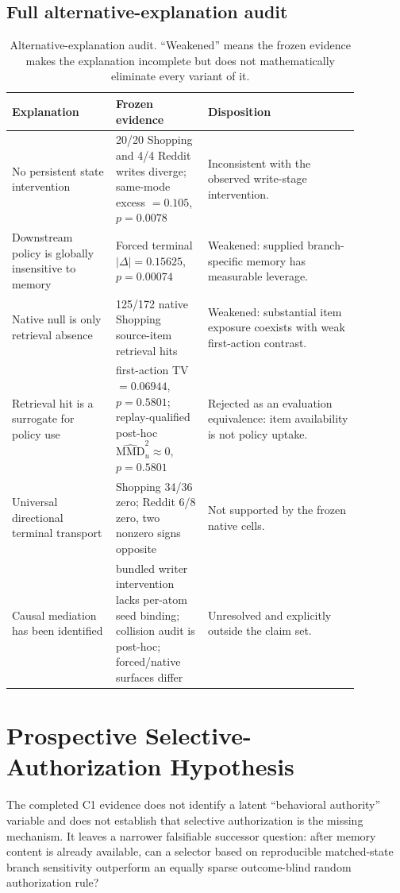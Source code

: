 \subsection{Full alternative-explanation audit}
\begin{table}[h]
\centering
\small
\caption{Alternative-explanation audit. ``Weakened'' means the frozen evidence makes the explanation incomplete but does not mathematically eliminate every variant of it.}
\label{tab:alternative-audit}
\begin{tabular}{@{}p{0.26\linewidth}p{0.23\linewidth}p{0.38\linewidth}@{}}
\toprule
Explanation & Frozen evidence & Disposition \\
\midrule
No persistent state intervention & 20/20 Shopping and 4/4 Reddit writes diverge; same-mode excess $=0.105$, $p=0.0078$ & Inconsistent with the observed write-stage intervention. \\
Downstream policy is globally insensitive to memory & Forced terminal $|\Delta|=0.15625$, $p=0.00074$ & Weakened: supplied branch-specific memory has measurable leverage. \\
Native null is only retrieval absence & 125/172 native Shopping source-item retrieval hits & Weakened: substantial item exposure coexists with weak first-action contrast. \\
Retrieval hit is a surrogate for policy use & first-action TV $=0.06944$, $p=0.5801$; replay-qualified post-hoc $\widehat{\mathrm{MMD}}^2_u\approx0$, $p=0.5801$ & Rejected as an evaluation equivalence: item availability is not policy uptake. \\
Universal directional terminal transport & Shopping 34/36 zero; Reddit 6/8 zero, two nonzero signs opposite & Not supported by the frozen native cells. \\
Causal mediation has been identified & bundled writer intervention lacks per-atom seed binding; collision audit is post-hoc; forced/native surfaces differ & Unresolved and explicitly outside the claim set. \\
\bottomrule
\end{tabular}
\end{table}

\section{Prospective Selective-Authorization Hypothesis}
The completed C1 evidence does not identify a latent ``behavioral authority'' variable and does not establish that selective authorization is the missing mechanism. It leaves a narrower falsifiable successor question: after memory content is already available, can a selector based on reproducible matched-state branch sensitivity outperform an equally sparse outcome-blind random authorization rule?

